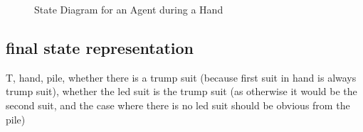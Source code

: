 \documentclass[10pt]{article} %
\begin{document}

\begin{figure}[h!]
\centering
{}
\caption{State Diagram for an Agent during a Hand}
\label{fig:states}
\end{figure}

\subsection{final state representation}

T, hand, pile, whether there is a trump suit (because first suit in hand is always trump suit), whether the led suit is the trump suit (as otherwise it would be the second suit, and the case where there is no led suit should be obvious from the pile)
\end{document}
